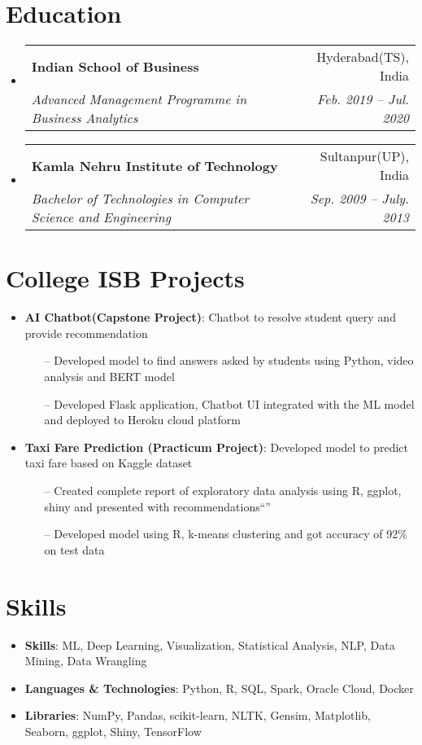 \documentclass[letterpaper,11pt]{article}
\makeatletter
\newcommand{\resumeItem}[2]{
  \item\small{
    \textbf{#1}{: #2 \vspace{-2pt}}
  }
}
\newcommand{\resumeSubheading}[4]{
  \vspace{-1pt}\item
    \begin{tabular*}{0.97\textwidth}[t]{l@{\extracolsep{\fill}}r}
      \textbf{#1} & #2 \\
      \textit{\small#3} & \textit{\small #4} \\
    \end{tabular*}\vspace{-5pt}
}
\newcommand{\resumeSubItem}[2]{\resumeItem{#1}{#2}\vspace{-4pt}}
\newcommand{\resumeSubHeadingListStart}{\begin{itemize}[leftmargin=*]}
\newcommand{\resumeSubHeadingListEnd}{\end{itemize}}
\makeatother
\begin{document}
\section{Education}
  \resumeSubHeadingListStart
    \resumeSubheading
      {Indian School of Business}{Hyderabad(TS), India}
      {Advanced Management Programme in Business Analytics}{Feb. 2019 -- Jul. 2020}
    \resumeSubheading
      {Kamla Nehru Institute of Technology}{Sultanpur(UP), India}
      {Bachelor of Technologies in Computer Science and Engineering}{Sep. 2009 -- July. 2013}
  \resumeSubHeadingListEnd

\section{College ISB Projects}
  \resumeSubHeadingListStart
    \resumeSubItem{AI Chatbot(Capstone Project)}
      {Chatbot to resolve student query and provide recommendation}
        \begin{itemize}
            \item[--] Developed model to find answers asked by students using Python, video analysis and BERT model
            \item[--] Developed Flask application, Chatbot UI integrated with the ML model and deployed to Heroku cloud platform
        \end{itemize}
    \resumeSubItem{Taxi Fare Prediction (Practicum Project)}
      {Developed model to predict taxi fare based on Kaggle dataset}
        \begin{itemize}
            \item[--] Created complete report of exploratory data analysis using R, ggplot, shiny and presented with recommendations``''
            \item[--] Developed model using R, k-means clustering and got accuracy of 92\% on test data
        \end{itemize}
  \resumeSubHeadingListEnd

\section{Skills}
 \resumeSubHeadingListStart
   \item{
     \textbf{Skills}{: ML, Deep Learning, Visualization, Statistical Analysis, NLP, Data Mining, Data Wrangling}
   }
   \item {
     \textbf{Languages \& Technologies}{: Python, R, SQL, Spark, Oracle Cloud, Docker}
   }
   \item {
     \textbf{Libraries}{: NumPy, Pandas, scikit-learn, NLTK, Gensim, Matplotlib, Seaborn, ggplot, Shiny,  TensorFlow}
   }
 \resumeSubHeadingListEnd


\end{document}
